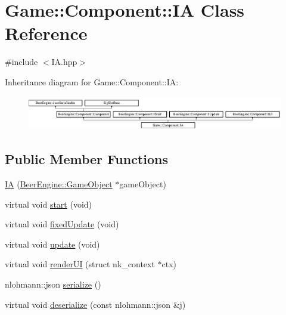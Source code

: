 \hypertarget{class_game_1_1_component_1_1_i_a}{}\section{Game\+:\+:Component\+:\+:IA Class Reference}
\label{class_game_1_1_component_1_1_i_a}


{\ttfamily \#include $<$I\+A.\+hpp$>$}

Inheritance diagram for Game\+:\+:Component\+:\+:IA\+:\begin{figure}[H]
\begin{center}
\leavevmode
\includegraphics[height=1.500000cm]{class_game_1_1_component_1_1_i_a}
\end{center}
\end{figure}
\subsection*{Public Member Functions}
\begin{DoxyCompactItemize}
\item 
\mbox{\hyperlink{class_game_1_1_component_1_1_i_a_a0193b2ba07bc5bcabe9278a6dcd592bc}{IA}} (\mbox{\hyperlink{class_beer_engine_1_1_game_object}{Beer\+Engine\+::\+Game\+Object}} $\ast$game\+Object)
\item 
virtual void \mbox{\hyperlink{class_game_1_1_component_1_1_i_a_ab440dc76a8837e291f6545e0dd15c819}{start}} (void)
\item 
virtual void \mbox{\hyperlink{class_game_1_1_component_1_1_i_a_a72b1e3aaf4686e0abef2e147d48f50e9}{fixed\+Update}} (void)
\item 
virtual void \mbox{\hyperlink{class_game_1_1_component_1_1_i_a_a5890e0da2fb55d58868c0cd441c33dc4}{update}} (void)
\item 
virtual void \mbox{\hyperlink{class_game_1_1_component_1_1_i_a_a50991daa660054341c1f339611226c02}{render\+UI}} (struct nk\+\_\+context $\ast$ctx)
\item 
nlohmann\+::json \mbox{\hyperlink{class_game_1_1_component_1_1_i_a_a3d5af6c25e457a246fac8cbd63764223}{serialize}} ()
\item 
virtual void \mbox{\hyperlink{class_game_1_1_component_1_1_i_a_a81f34676232065d85961d84be1268e6f}{deserialize}} (const nlohmann\+::json \&j)
\end{DoxyCompactItemize}
